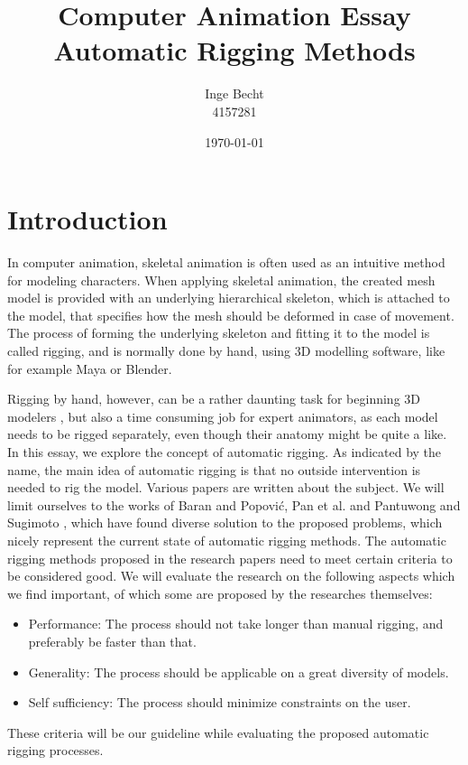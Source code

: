 \documentclass{article}
\title{Computer Animation Essay\\ Automatic Rigging Methods}
\author{Inge Becht\\ 4157281}
\date{\today}
\begin{document}
\maketitle

\section{Introduction}
In computer animation, skeletal animation is often used as an intuitive method
for modeling characters. When applying skeletal animation, the created mesh
model is provided with an underlying hierarchical skeleton, which is attached to
the model, that specifies how the mesh should be deformed in case of movement. The process of forming
the underlying skeleton and fitting it to the model is called rigging, and is
normally done by hand, using 3D modelling software, like for example Maya or
Blender.

Rigging by hand, however, can be a rather daunting task for beginning 3D
modelers \citep{paper1}, but also a time consuming job for expert animators, as
each model needs to be rigged separately, even though their anatomy might be
quite a like.
In this essay, we explore the concept of automatic rigging. As indicated by the
name, the main idea of automatic rigging is that no outside intervention is
needed to rig the model.
Various papers are written about the subject. We will limit ourselves to
the works of Baran and Popovi\'{c}\citep{paper1}, Pan et al. \citep{paper2} and
Pantuwong and Sugimoto \citep{paper3}, which have found
diverse solution to the proposed problems, which nicely represent the current
state of automatic rigging methods.
The automatic rigging methods proposed in the research papers need to meet
certain criteria to be considered good. We will evaluate the research on the
following aspects which we find important, of which some are proposed by the
researches themselves:

\begin{itemize}
    \item Performance: The process should not take longer than manual rigging, and
        preferably be faster than that.
    \item Generality: The process should be applicable on a great diversity of models.
    \item Self sufficiency: The process should minimize constraints on the user.
\end{itemize}
These criteria will be our guideline while evaluating the proposed automatic rigging processes.
\end{document}
